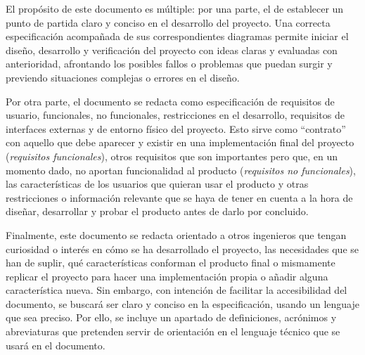 El propósito de este documento es múltiple: por una parte, el de establecer
un punto de partida claro y conciso en el desarrollo del proyecto. Una correcta
especificación acompañada de sus correspondientes diagramas
permite iniciar el diseño, desarrollo y verificación del proyecto con ideas
claras y evaluadas con anterioridad, afrontando los posibles fallos o problemas
que puedan surgir y previendo situaciones complejas o errores en el diseño.

Por otra parte, el documento se redacta como especificación de
requisitos de usuario, funcionales, no funcionales, restricciones en el
desarrollo, requisitos de interfaces externas y de entorno físico del proyecto.
Esto sirve como ``contrato'' con aquello que debe aparecer y existir en
una implementación final del proyecto (\textit{requisitos funcionales}),
otros requisitos que son importantes pero que, en un momento dado, no aportan
funcionalidad al producto (\textit{requisitos no funcionales}), las
características de los usuarios que quieran usar el producto y otras restricciones
o información relevante que se haya de tener en cuenta a la hora de diseñar, 
desarrollar y probar el producto antes de darlo por concluido.

Finalmente, este documento se redacta orientado a otros ingenieros que
tengan curiosidad o interés en cómo se ha desarrollado el proyecto, las necesidades
que se han de suplir, qué características conforman el producto final o mismamente
replicar el proyecto para hacer una implementación propia o añadir alguna 
característica nueva. Sin embargo, con intención de facilitar la accesibilidad del
documento, se buscará ser claro y conciso en la especificación, usando un
lenguaje que sea preciso. Por ello, se incluye un apartado de definiciones,
acrónimos y abreviaturas que pretenden servir
de orientación en el lenguaje técnico que se usará en el documento.